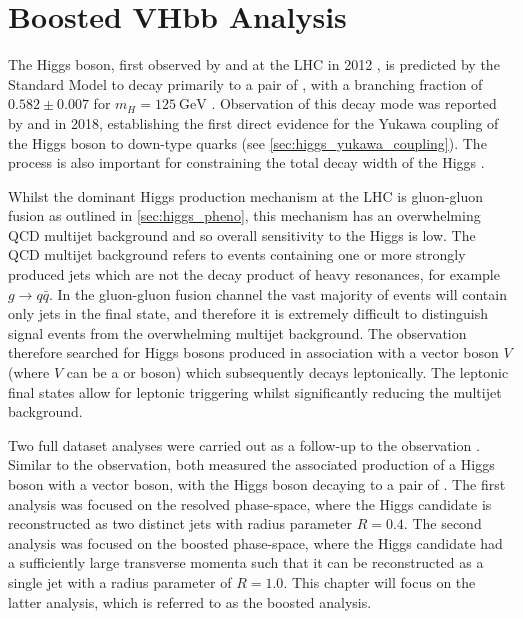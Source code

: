 
\chapter{Boosted VHbb Analysis}\label{chap:vhbb_boosted}

The Higgs boson, first observed by \ATLAS and \CMS at the LHC in 2012 \cite{HIGG-2012-27,CMS-HIG-12-028}, is predicted by the Standard Model to decay primarily to a pair of \bquarks, with a branching fraction of $0.582 \pm 0.007$ for $m_H = \SI{125}{\GeV}$ \cite{deFlorian:2016spz}. 
Observation of this decay mode was reported by \ATLAS \cite{HIGG-2018-04} and \CMS \cite{CMS-HIG-18-016} in 2018, establishing the first direct evidence for the Yukawa coupling of the Higgs boson to down-type quarks (see \cref{sec:higgs_yukawa_coupling}).
The \Hbb process is also important for constraining the total decay width of the Higgs \cite{Lafaye:2009vr}.

Whilst the dominant Higgs production mechanism at the LHC is gluon-gluon fusion as outlined in \cref{sec:higgs_pheno}, this mechanism has an overwhelming QCD multijet background and so overall sensitivity to the Higgs is low.
The QCD multijet background refers to events containing one or more strongly produced jets which are not the decay product of heavy resonances, for example $g \to q\bar{q}$.
In the \Hbb gluon-gluon fusion channel the vast majority of events will contain only jets in the final state, and therefore it is extremely difficult to distinguish signal events from the overwhelming multijet background.
The \hbb observation therefore searched for Higgs bosons produced in association with a vector boson $V$ (where $V$ can be a \Wboson or \Zboson boson) which subsequently decays leptonically.
The leptonic final states allow for leptonic triggering whilst significantly reducing the multijet background.

Two full \runtwo dataset analyses were carried out as a follow-up to the \Hbb observation \cite{HIGG-2018-04}.
Similar to the observation, both measured the associated production of a Higgs boson with a vector boson, with the Higgs boson decaying to a pair of \bquarks.
The first analysis \cite{HIGG-2018-51} was focused on the resolved phase-space, where the Higgs candidate is reconstructed as two distinct jets with radius parameter $R = 0.4$.
The second analysis \cite{HIGG-2018-52} was focused on the boosted phase-space, where the Higgs candidate had a sufficiently large transverse momenta such that it can be reconstructed as a single jet with a radius parameter of $R = 1.0$.
This chapter will focus on the latter analysis, which is referred to as the boosted \VHbb analysis.

